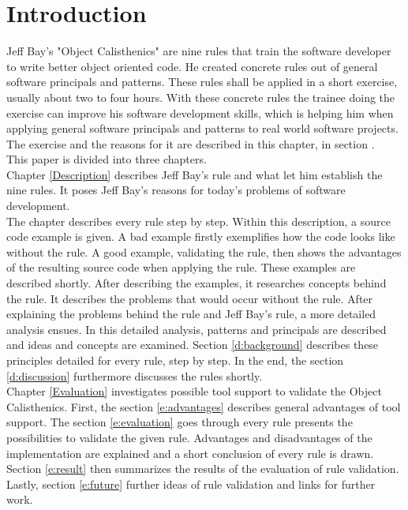 \chapter{Introduction}
Jeff Bay's "Object Calisthenics" \cite{bay2008} are nine rules that train the software developer to write better object oriented code.  He created concrete rules out of general software principals and patterns. These rules shall be applied in a short exercise, usually about two to four hours. With these concrete rules the trainee doing the exercise can improve his software development skills, which is helping him when applying general software principals and patterns to real world software projects. The exercise and the reasons for it are described in this chapter, in section \cite{i:exercising}.\\

This paper is divided into three chapters.\\

Chapter \ref{Description} describes Jeff Bay's rule and what let him establish the nine rules. It poses Jeff Bay's reasons for today's problems of software development.\\

The chapter describes every rule step by step. Within this description, a source code example is given. A bad example firstly exemplifies how the code looks like without the rule. A good example, validating the rule, then shows the advantages of the resulting source code when applying the rule. These examples are described shortly. After describing the examples, it researches concepts behind the rule. It describes the problems that would occur without the rule. After explaining the problems behind the rule and Jeff Bay's rule, a more detailed analysis ensues. In this detailed analysis, patterns and principals are described and ideas and concepts are examined. Section \ref{d:background} describes these principles detailed for every rule, step by step. In the end, the section \ref{d:discussion} furthermore discusses the rules shortly.\\

Chapter \ref{Evaluation} investigates possible tool support to validate the Object Calisthenics. First, the section \ref{e:advantages} describes general advantages of tool support. The section \ref{e:evaluation} goes through every rule presents the possibilities to validate the given rule. Advantages and disadvantages of the implementation are explained and a short conclusion of every rule is drawn. Section \ref{e:result} then summarizes the results of the evaluation of rule validation. Lastly, section \ref{e:future} further ideas of rule validation and links for further work.\\

